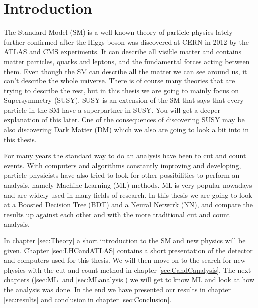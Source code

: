 \chapter*{Introduction}
\label{sec:Introduction}
The Standard Model (SM) \cite{thomson} is a well known theory of particle physics lately further confirmed after the Higgs boson was discovered at CERN in 2012 by the ATLAS \cite{Higgs_ATLAS} and CMS \cite{Higgs_CMS} experiments. It can describe all visible matter and contains matter particles, quarks and leptons, and the fundamental forces acting between them. Even though the SM can describe all the matter we can see around us, it can't describe the whole universe. There is of course many theories that are trying to describe the rest, but in this thesis we are going to mainly focus on Supersymmetry (SUSY). SUSY is an extension of the SM that says that every particle in the SM have a superpartner in SUSY. You will get a deeper explanation of this later. One of the consequences of discovering SUSY may be also discovering Dark Matter (DM) which we also are going to look a bit into in this thesis.

For many years the standard way to do an analysis have been to cut and count events. With computers and algorithms constantly improving and developing, particle physicists have also tried to look for other possibilities to perform an analysis, namely Machine Learning (ML) methods. ML is very popular nowadays and are widely used in many fields of research. In this thesis we are going to look at a Boosted Decision Tree (BDT) and a Neural Network (NN), and compare the results up against each other and with the more traditional cut and count analysis. 

In chapter \ref{sec:Theory} a short introduction to the SM and new physics will be given. Chapter \ref{sec:LHCandATLAS} contains a short presentation of the detector and computers used for this thesis. We will then move on to the search for new physics with the cut and count method in chapter \ref{sec:CandCanalysis}. The next chapters (\ref{sec:ML} and \ref{sec:MLanalysis}) we will get to know ML and look at how the analysis was done. In the end we have presented our results in chapter \ref{sec:results} and conclusion in chapter \ref{sec:Conclusion}.

